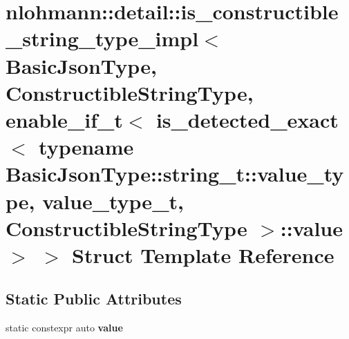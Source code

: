 \hypertarget{structnlohmann_1_1detail_1_1is__constructible__string__type__impl_3_01BasicJsonType_00_01Construe4743afb22172cdb3c5f428800835387}{}\section{nlohmann\+:\+:detail\+:\+:is\+\_\+constructible\+\_\+string\+\_\+type\+\_\+impl$<$ Basic\+Json\+Type, Constructible\+String\+Type, enable\+\_\+if\+\_\+t$<$ is\+\_\+detected\+\_\+exact$<$ typename Basic\+Json\+Type\+:\+:string\+\_\+t\+:\+:value\+\_\+type, value\+\_\+type\+\_\+t, Constructible\+String\+Type $>$\+:\+:value $>$ $>$ Struct Template Reference}
\label{structnlohmann_1_1detail_1_1is__constructible__string__type__impl_3_01BasicJsonType_00_01Construe4743afb22172cdb3c5f428800835387}
\subsection*{Static Public Attributes}
\begin{DoxyCompactItemize}
\item 
static constexpr auto {\bfseries value}
\end{DoxyCompactItemize}


